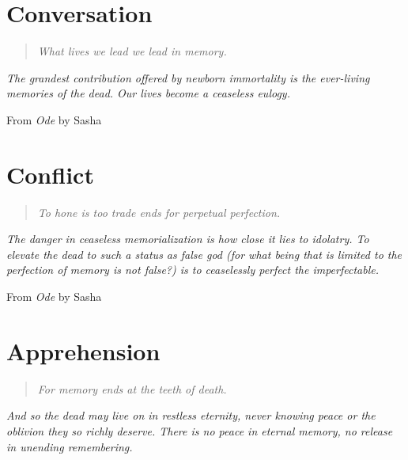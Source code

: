 \documentclass[11pt]{memoir}
\begin{document}
  \part{Conversation}
  \begin{quote}\itshape
    What lives we lead we lead in memory.
  \end{quote}

  \noindent\emph{The grandest contribution offered by newborn immortality is the ever-living memories of the dead. Our lives become a ceaseless eulogy.}

  \vspace{1em}

  From \emph{Ode} by Sasha
  \vfill

  
  
  
  
  
  
  
  

  \part{Conflict}
  \begin{quote}\itshape
    To hone is too trade ends for perpetual perfection.
  \end{quote}
  
  \noindent\emph{The danger in ceaseless memorialization is how close it lies to idolatry. To elevate the dead to such a status as false god (for what being that is limited to the perfection of memory is not false?) is to ceaselessly perfect the imperfectable.}

  \vspace{1em}

  From \emph{Ode} by Sasha
  \vfill

  
  
  
  
  
  
  
  
  

  \part{Apprehension}
  \begin{quote}\itshape
    For memory ends at the teeth of death.
  \end{quote}
  
  \noindent\emph{And so the dead may live on in restless eternity, never knowing peace or the oblivion they so richly deserve. There is no peace in eternal memory, no release in unending remembering.}
\end{document}
